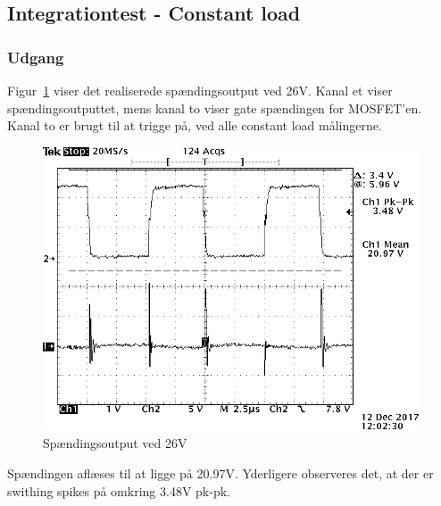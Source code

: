 \subsection{Integrationtest - Constant load}

\subsubsection{Udgang}
Figur~\ref{fig: Out26V} viser det realiserede spændingsoutput ved 26V. Kanal et viser spændingsoutputtet, mens kanal to viser gate spændingen for MOSFET'en. Kanal to er brugt til at trigge på, ved alle constant load målingerne. 
\begin{figure}[H]
	\center
	\includegraphics[max width=0.7\linewidth]{../dokumentation/tex/2iteration/billeder/Realisering/udgang_f_filter_2iteration.png}
	\caption{Spændingsoutput ved 26V}
	\label{fig: Out26V}
\end{figure}
Spændingen aflæses til at ligge på 20.97V. Yderligere observeres det, at der er swithing spikes på omkring 3.48V pk-pk.

